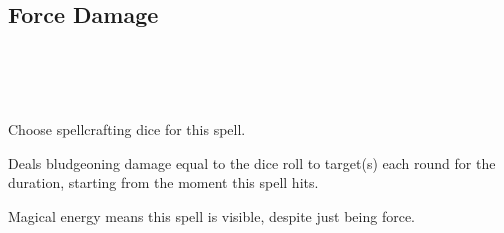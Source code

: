 \subsection*{Force Damage}
 \\
\\
\\

Choose spellcrafting dice for this spell.

Deals bludgeoning damage equal to the dice roll to target(s) each round
for the duration, starting from the moment this spell hits.

Magical energy means this spell is visible, despite just being force.
